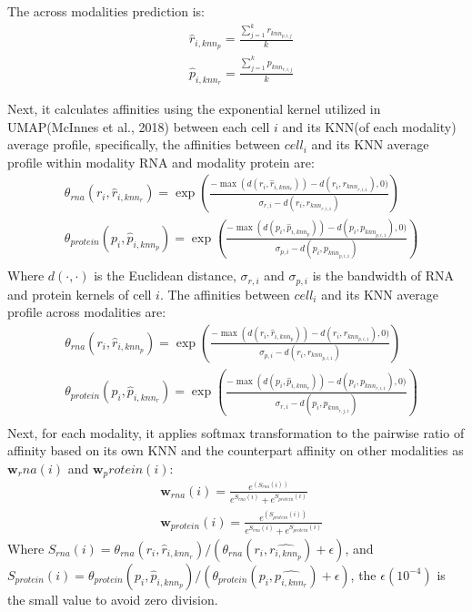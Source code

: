 The across modalities prediction is:
\begin{equation}
	\begin{aligned}
		&\hat{r}_{i, knn_p}=\frac{\sum_{j=1}^{k} r_{k n n_{p, i, j}}}{k} \\
		&\hat{p}_{i, knn_r}=\frac{\sum_{j=1}^{k} p_{k n n_{r, i, j}}}{k}
	\end{aligned}
\end{equation}

Next, it calculates affinities using the exponential kernel utilized in UMAP(McInnes et al., 2018) between each cell $i$ and its KNN(of each modality) average profile, specifically, the affinities between $cell_i$ and its KNN average profile within modality RNA and modality protein are:
\begin{equation}
	\begin{aligned}
		& \theta_{rna}\left(r_i,\hat{r}_{i, knn_r}\right) = \exp\left( \frac{-\max(d(r_i, \hat{r}_{i,knn_r}))-d(r_i, r_{knn_{r,i,1}}), 0)}{\sigma_{r,i} - d(r_i,r_{knn_{r,i,1}})}\right)\\
		& \theta_{protein}\left(p_i,\hat{p}_{i, knn_p}\right) = \exp\left( \frac{-\max(d(p_i, \hat{p}_{i,knn_p}))-d(p_i, p_{knn_{p,i,1}}), 0)}{\sigma_{p,i} - d(p_i,p_{knn_{p,i,1}})}\right)\\
	\end{aligned}
\end{equation}
Where $d(\cdot,\cdot)$ is the Euclidean distance, $\sigma_{r, i}$ and $\sigma_{p, i}$ is the bandwidth of RNA and protein kernels of cell $i$. The affinities between $cell_i$ and its KNN average profile across modalities are:
\begin{equation}
	\begin{aligned}
		& \theta_{rna}\left(r_i, \hat{r}_{i,knn_p}\right) = \exp\left( \frac{-\max(d(r_i, \hat{r}_{i,knn_p}))-d(r_i, r_{knn_{p,i,1}}), 0)}{\sigma_{p,i} - d(r_i,r_{knn_{p,i,1}})}\right)\\
		& \theta_{protein}\left(p_i, \hat{p}_{i,knn_r}\right) = \exp\left( \frac{-\max(d(p_i, \hat{p}_{i,knn_r}))-d(p_i, p_{knn_{r,i,1}}), 0)}{\sigma_{r,i} - d(p_i,p_{knn_{r,j,1}})}\right)\\
	\end{aligned}
\end{equation}
Next, for each modality, it applies softmax transformation to the pairwise ratio of affinity based on its own KNN and the counterpart affinity on other modalities as $\textbf{w}_rna(i)$ and $\textbf{w}_protein(i)$:
\begin{equation}
	\begin{aligned}
	& \textbf{w}_{rna}(i)=\frac{e^{(S_{rna}(i))}}{e^{S_{rna}(i)} + e^{S_{protein}(i)}}\\
	& \textbf{w}_{protein}(i)=\frac{e^{(S_{protein}(i))}}{e^{S_{rna}(i)} + e^{S_{protein}(i)}}
	\end{aligned}
\end{equation}
Where $S_{rna}(i) = \theta_{rna}(r_i, \hat{r}_{i,knn_r})/(\theta_{rna}(r_i, \hat{r_{i,knn_p}}) + \epsilon)$, and $S_{protein}(i) = \theta_{protein}(p_i, \hat{p}_{i,knn_p})/(\theta_{protein}(p_i, \hat{p_{i,knn_r}}) + \epsilon)$, the $\epsilon(10^{-4})$ is the small value to avoid zero division.

